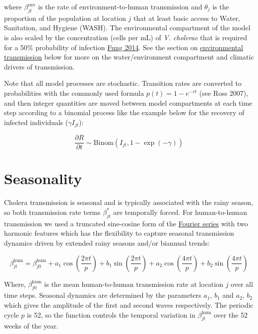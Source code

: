 \documentclass[
]{book}
\begin{document}
where \(\beta_{jt}^{\text{env}}\) is the rate of environment-to-human transmission and \(\theta_j\) is the proportion of the population at location \(j\) that at least basic access to Water, Sanitation, and Hygiene (WASH). The environmental compartment of the model is also scaled by the concentration (cells per mL) of \emph{V. cholerae} that is required for a 50\% probability of infection \href{https://www.ncbi.nlm.nih.gov/pmc/articles/PMC3926264/}{Fung 2014}. See the section on \hyperref[environmental-transmission]{environmental transmission} below for more on the water/environment compartment and climatic drivers of transmission.

Note that all model processes are stochastic. Transition rates are converted to probabilities with the commonly used formula \(p(t) = 1-e^{-rt}\) (see Ross 2007), and then integer quantities are moved between model compartments at each time step according to a binomial process like the example below for the recovery of infected individuals (\(\gamma I_{jt}\)):

\begin{equation}
\frac{\partial R}{\partial t} \sim \text{Binom}(I_{jt}, 1-\exp(-\gamma))
\label{eq:stoch}
\end{equation}

\section{Seasonality}\label{seasonality}

Cholera transmission is seasonal and is typically associated with the rainy season, so both transmission rate terms \(\beta_{jt}^{\text{*}}\) are temporally forced. For human-to-human transmission we used a truncated sine-cosine form of the \href{https://en.wikipedia.org/wiki/Fourier_series}{Fourier series} with two harmonic features which has the flexibility to capture seasonal transmission dynamics driven by extended rainy seasons and/or biannual trends:

\begin{equation}
\beta_{jt}^{\text{hum}} = \beta_{j0}^{\text{hum}} + a_1 \cos\left(\frac{2\pi t}{p}\right) + b_1 \sin\left(\frac{2\pi t}{p}\right) + a_2 \cos\left(\frac{4\pi t}{p}\right) + b_2 \sin\left(\frac{4\pi t}{p}\right)
\label{eq:beta1}
\end{equation}

Where, \(\beta_{j0}^{\text{hum}}\) is the mean human-to-human transmission rate at location \(j\) over all time steps. Seasonal dynamics are determined by the parameters \(a_1\), \(b_1\) and \(a_2\), \(b_2\) which gives the amplitude of the first and second waves respectively. The periodic cycle \(p\) is 52, so the function controls the temporal variation in \(\beta_{jt}^{\text{hum}}\) over the 52 weeks of the year.
\end{document}
